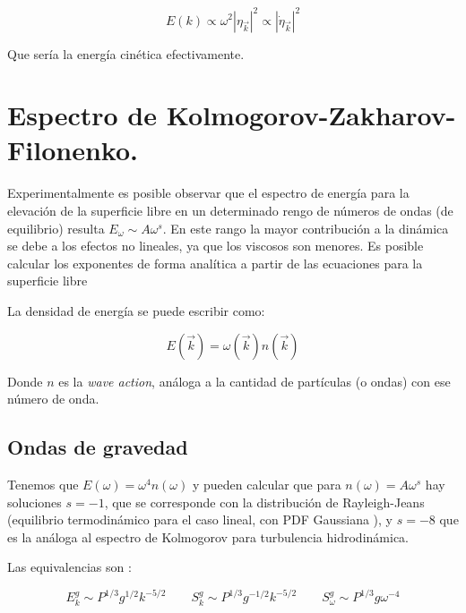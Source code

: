 \begin{equation}
	E(k) \propto \omega^2|\eta_{\vec k}|^2 \propto |\dot \eta_{\vec k}|^2 
\end{equation}

Que sería la energía cinética efectivamente.










\section{Espectro de Kolmogorov-Zakharov-Filonenko.}
Experimentalmente es posible observar que el espectro de energía para la elevación de la superficie libre en un determinado rengo de números de ondas (de equilibrio) resulta $E_\omega  \sim A\omega^s$. En este rango la mayor contribución a la dinámica se debe a los efectos no lineales, ya que los viscosos son menores. Es posible calcular los exponentes de forma analítica a partir de las ecuaciones para la superficie libre \cite{zakharovEnergySpectrumStochastic1967}

La densidad de energía se puede escribir como:

\begin{equation}
	E(\vec k) = \omega(\vec k) n(\vec k)
\end{equation}  

Donde $n$ es la \textit{wave action}, análoga a la cantidad de partículas (o ondas) con ese número de onda.

\subsection*{Ondas de gravedad \cite{zakharovEnergySpectrumStochastic1967}}
Tenemos que $E(\omega)=\omega^4n(\omega)$ y pueden calcular que para $n(\omega)=A\omega^s$ hay soluciones $s=-1$, que se corresponde con la distribución de Rayleigh-Jeans (equilibrio termodinámico para el caso lineal, con PDF Gaussiana \cite{nazarenkoWaveTurbulence2011}), y $s=-8$ que es la análoga al espectro de Kolmogorov para turbulencia hidrodinámica.

Las equivalencias son \cite{falconExperimentsSurfaceGravity2022}:

\begin{equation}
	E_k^g \sim P^{1/3} g^{1/2} k^{-5/2} \qquad S_k^g \sim P^{1/3} g^{-1/2} k^{-5/2} \qquad S_\omega^g  \sim P^{1/3} g \omega^{-4}
\end{equation}  

